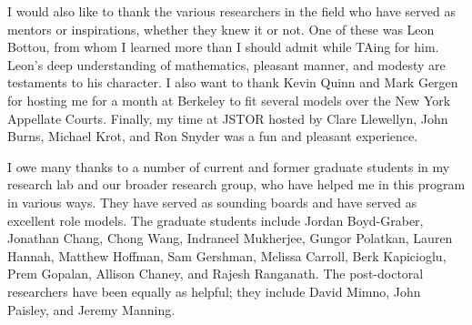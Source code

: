 I would also like to thank the various researchers in the field who
have served as mentors or inspirations, whether they knew it or not.
One of these was Leon Bottou, from whom I learned more than I should
admit while TAing for him. Leon's deep understanding of mathematics,
pleasant manner, and modesty are testaments to his character.  I also
want to thank Kevin Quinn and Mark Gergen for hosting me for a month
at Berkeley to fit several models over the New York Appellate Courts.
Finally, my time at JSTOR hosted by Clare Llewellyn, John Burns,
Michael Krot, and Ron Snyder was a fun and pleasant experience.

I owe many thanks to a number of current and former graduate students
in my research lab and our broader research group, who have helped me
in this program in various ways.  They have served as sounding boards
and have served as excellent role models.  The graduate students
include Jordan Boyd-Graber, Jonathan Chang, Chong Wang, Indraneel
Mukherjee, Gungor Polatkan, Lauren Hannah, Matthew Hoffman, Sam
Gershman, Melissa Carroll, Berk Kapicioglu, Prem Gopalan, Allison
Chaney, and Rajesh Ranganath.  The post-doctoral researchers have been
equally as helpful; they include David Mimno, John Paisley, and Jeremy
Manning.



